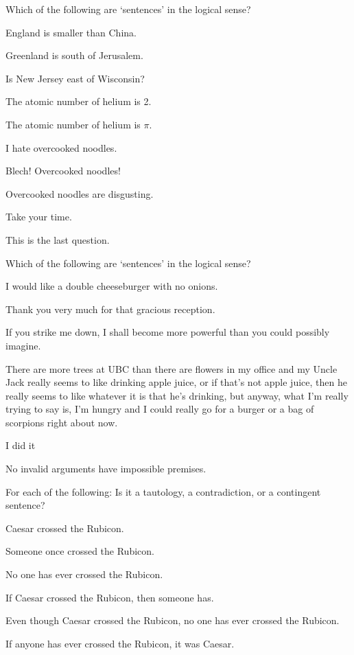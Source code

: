 \solutions
\problempart
\label{pr.Sentences1}
Which of the following are `sentences' in the logical sense?
\begin{earg}
\item England is smaller than China.
\item Greenland is south of Jerusalem.
\item Is New Jersey east of Wisconsin?
\item The atomic number of helium is 2.
\item The atomic number of helium is $\pi$.
\item I hate overcooked noodles.
\item Blech! Overcooked noodles!
\item Overcooked noodles are disgusting.
\item Take your time.
\item This is the last question.
\end{earg}

\problempart
\label{hw1.B}
Which of the following are `sentences' in the logical sense?
	\begin{earg}
		\item I would like a double cheeseburger with no onions.
		\item Thank you very much for that gracious reception.
		\item If you strike me down, I shall become more powerful than you could possibly imagine.
		\item There are more trees at UBC than there are flowers in my office and my Uncle Jack really seems to like drinking apple juice, or if that's not apple juice, then he really seems to like whatever it is that he's drinking, but anyway, what I'm really trying to say is, I'm hungry and I could really go for a burger or a bag of scorpions right about now.
		\item I did it
		\item No invalid arguments have impossible premises.
	\end{earg}

\problempart
\label{pr.EnglishTautology}
For each of the following: Is it a tautology, a contradiction, or a contingent sentence?
\begin{earg}
\item Caesar crossed the Rubicon.
\item Someone once crossed the Rubicon.
\item No one has ever crossed the Rubicon.
\item If Caesar crossed the Rubicon, then someone has.
\item Even though Caesar crossed the Rubicon, no one has ever crossed the Rubicon.
\item If anyone has ever crossed the Rubicon, it was Caesar.
\end{earg}

